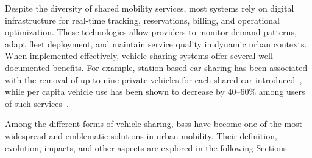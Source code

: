 Despite the diversity of shared mobility services, most systems rely on digital infrastructure for real-time tracking, reservations, billing, and operational optimization. These technologies allow providers to monitor demand patterns, adapt fleet deployment, and maintain service quality in dynamic urban contexts. When implemented effectively, vehicle-sharing systems offer several well-documented benefits. For example, station-based car-sharing has been associated with the removal of up to nine private vehicles for each shared car introduced~\cite{Kolleck2021}, while per capita vehicle use has been shown to decrease by 40–60\% among users of such services~\cite{Litman2000}.

Among the different forms of vehicle-sharing, \acp{bss} have become one of the most widespread and emblematic solutions in urban mobility. Their definition, evolution, impacts, and other aspects are explored in the following Sections.